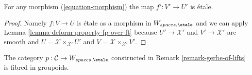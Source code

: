 \begin{lemma}
\label{lemma-morphisms-lifts-etale}
For any morphism (\ref{equation-morphism}) the map $f' : V' \to U'$ is \'etale.
\end{lemma}

\begin{proof}
Namely $f : V \to U$ is \'etale as a morphism in $W_{spaces, \etale}$
and we can apply
Lemma \ref{lemma-deform-property-fp-over-ft} because $U' \to \mathcal{X}'$
and $V' \to \mathcal{X}'$ are smooth and
$U = \mathcal{X} \times_{\mathcal{X}'} U'$ and
$V = \mathcal{X} \times_{\mathcal{X}'} V'$.
\end{proof}

\begin{lemma}
\label{lemma-gerbe-of-lifts-fibred}
The category $p : \mathcal{C} \to W_{spaces, \etale}$ constructed
in Remark \ref{remark-gerbe-of-lifts} is fibred in groupoids.
\end{lemma}

